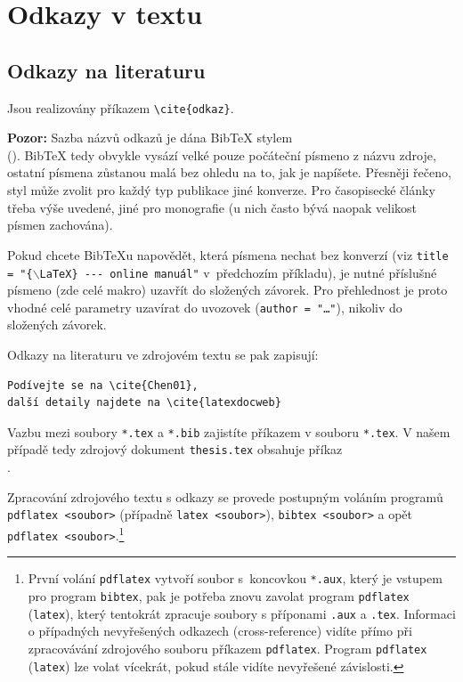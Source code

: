 \documentclass[11pt,twoside,a4paper]{book}
\begin{document}
\section{Odkazy v textu}
\subsection{Odkazy na literaturu}
Jsou realizovány příkazem \verb|\cite{odkaz}|. 

\textbf{Pozor:} Sazba názvů odkazů je dána Bib\TeX{} stylem\\ (\verb||). 
Bib\TeX{} tedy obvykle vysází velké pouze počáteční písmeno z názvu zdroje, 
ostatní písmena zůstanou malá bez ohledu na to, jak je napíšete. 
Přesněji řečeno, styl může zvolit pro každý typ publikace jiné konverze. 
Pro časopisecké články třeba výše uvedené, jiné pro monografie (u nich často bývá 
naopak velikost písmen zachována).

Pokud chcete Bib\TeX u napovědět, která písmena nechat bez konverzí 
(viz \texttt{title = "\{$\backslash$LaTeX\} -{}-{}- online manuál"} 
v~předchozím příkladu), je nutné příslušné písmeno (zde celé makro) uzavřít 
do složených závorek. Pro přehlednost je proto vhodné celé parametry 
uzavírat do uvozovek (\texttt{author = "\dots"}), nikoliv do složených závorek.

Odkazy na literaturu ve zdrojovém textu se pak zapisují:
\begin{verbatim}
Podívejte se na \cite{Chen01}, 
další detaily najdete na \cite{latexdocweb}
\end{verbatim}

Vazbu mezi soubory \verb|*.tex| a \verb|*.bib| zajistíte příkazem 
\verb|| v souboru \verb|*.tex|.  V našem případě tedy zdrojový 
dokument \verb|thesis.tex| obsahuje příkaz\\
\verb||.

Zpracování zdrojového textu s odkazy se provede postupným voláním programů\\
\verb|pdflatex <soubor>| (případně \verb|latex <soubor>|), \verb|bibtex <soubor>| 
a opět\\ \verb|pdflatex <soubor>|.\footnote{První volání \texttt{pdflatex} 
vytvoří soubor s~koncovkou \texttt{*.aux}, který je vstupem pro program 
\texttt{bibtex}, pak je potřeba znovu zavolat program \texttt{pdflatex} 
(\texttt{latex}), který tentokrát zpracuje soubory s příponami \texttt{.aux} a 
\texttt{.tex}. 
Informaci o případných nevyřešených odkazech (cross-reference) vidíte přímo při 
zpracovávání zdrojového souboru příkazem \texttt{pdflatex}. Program \texttt{pdflatex} 
(\texttt{latex}) lze volat vícekrát, pokud stále vidíte nevyřešené závislosti.}
\end{document}
